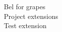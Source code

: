 \documentclass[preview]{standalone}
\begin{document}
Bel for grapes\\Project extensions\\Test extension\\
\end{document}
